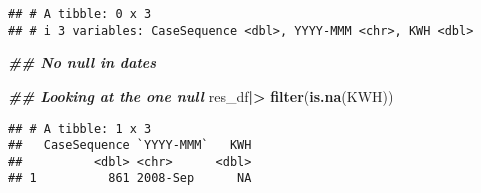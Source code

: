 \documentclass[
]{article}
\newenvironment{Shaded}{\begin{snugshade}}{\end{snugshade}}
\newcommand{\DocumentationTok}[1]{\textcolor[rgb]{0.56,0.35,0.01}{\textbf{\textit{#1}}}}
\newcommand{\FunctionTok}[1]{\textcolor[rgb]{0.13,0.29,0.53}{\textbf{#1}}}
\newcommand{\NormalTok}[1]{#1}
\newcommand{\SpecialCharTok}[1]{\textcolor[rgb]{0.81,0.36,0.00}{\textbf{#1}}}
\begin{document}
\begin{verbatim}
## # A tibble: 0 x 3
## # i 3 variables: CaseSequence <dbl>, YYYY-MMM <chr>, KWH <dbl>
\end{verbatim}

\begin{Shaded}
\begin{Highlighting}[]
\DocumentationTok{\#\# No null in dates}

\DocumentationTok{\#\# Looking at the one null }
\NormalTok{res\_df}\SpecialCharTok{|\textgreater{}} \FunctionTok{filter}\NormalTok{(}\FunctionTok{is.na}\NormalTok{(KWH))}
\end{Highlighting}
\end{Shaded}

\begin{verbatim}
## # A tibble: 1 x 3
##   CaseSequence `YYYY-MMM`   KWH
##          <dbl> <chr>      <dbl>
## 1          861 2008-Sep      NA
\end{verbatim}
\end{document}
